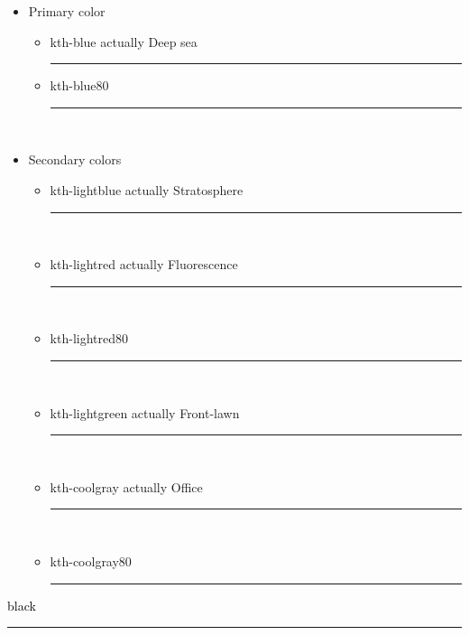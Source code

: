 \documentclass[
English,                 %
includepublications,    %
%
%
%
%
%
%
%
%
%
%
%
%
%
%
%
%
%
%
]{kththesis}
\begin{document}
\begin{itemize}[noitemsep]
    \item Primary color
    \begin{itemize}
    \item \textcolor{kth-blue}{kth-blue \ifdigitaloutput
    actually Deep sea
    \else
    {\color{kth-blue} \rule{0.3\linewidth}{1mm}}
    \fi
    }
    \item \textcolor{kth-blue80}{kth-blue80} {\color{kth-blue80} \rule{0.3\linewidth}{1mm} }\\
\end{itemize}

\item  Secondary colors
\begin{itemize}[noitemsep]
    \item \textcolor{kth-lightblue}{kth-lightblue \ifdigitaloutput
    actually Stratosphere
    \fi} {\color{kth-lightblue} \rule{0.3\linewidth}{1mm} }\\

    \item \textcolor{kth-lightred}{kth-lightred \ifdigitaloutput
    actually Fluorescence\fi} {\color{kth-lightred} \rule{0.3\linewidth}{1mm} }\\

    \item \textcolor{kth-lightred80}{kth-lightred80} {\color{kth-lightred80} \rule{0.3\linewidth}{1mm} }\\

    \item \textcolor{kth-lightgreen}{kth-lightgreen \ifdigitaloutput
    actually Front-lawn\fi} {\color{kth-lightgreen} \rule{0.3\linewidth}{1mm} }\\

    \item \textcolor{kth-coolgray}{kth-coolgray \ifdigitaloutput
    actually Office\fi} {\color{kth-coolgray} \rule{0.3\linewidth}{1mm} }\\

    \item \textcolor{kth-coolgray80}{kth-coolgray80} {\color{kth-coolgray80} \rule{0.3\linewidth}{1mm} }
\end{itemize}
\end{itemize}

\textcolor{black}{black} {\color{black} \rule{\linewidth}{1mm} }

\ifnomenclature
    \cleardoublepage
\end{document}
